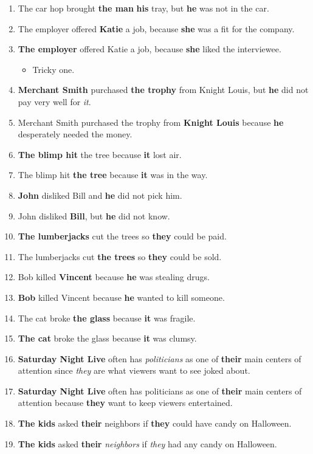 \documentclass{article}
\begin{document}
\begin{enumerate}
	\item The car hop brought {\bf the man} {\bf his} tray, but {\bf he} was not in the car.
	\item The employer offered {\bf Katie} a job, because {\bf she} was a fit for the company.
	\item {\bf The employer} offered Katie a job, because {\bf she} liked the interviewee.
		\begin{itemize}
			\item Tricky one.
		\end{itemize}
	\item {\bf Merchant Smith} purchased {\bf the trophy} from Knight Louis, but {\bf he} did not pay very well for {\it it}.
	\item Merchant Smith purchased the trophy from {\bf Knight Louis} because {\bf he} desperately needed the money.
	\item {\bf The blimp hit} the tree because {\bf it} lost air.
	\item The blimp hit {\bf the tree} because {\bf it} was in the way.
	\item {\bf John} disliked Bill and {\bf he} did not pick him.
	\item John disliked {\bf Bill}, but {\bf he} did not know.
	\item {\bf The lumberjacks} cut the trees so {\bf they} could be paid.
	\item The lumberjacks cut {\bf the trees} so {\bf they} could be sold.
	\item Bob killed {\bf Vincent} because {\bf he} was stealing drugs.
	\item {\bf Bob} killed Vincent because {\bf he} wanted to kill someone.
	\item The cat broke {\bf the glass} because {\bf it} was fragile.
	\item {\bf The cat} broke the glass because {\bf it} was clumsy.
	\item {\bf Saturday Night Live} often has {\it politicians} as one of {\bf their} main centers of attention since {\it they} are what viewers want to see joked about.
	\item {\bf Saturday Night Live} often has politicians as one of {\bf their} main centers of attention because {\bf they} want to keep viewers entertained.
	\item {\bf The kids} asked {\bf their} neighbors if {\bf they} could have candy on Halloween.
	\item {\bf The kids} asked {\bf their} {\it neighbors} if {\it they} had any candy on Halloween.

\end{enumerate}
\end{document}
